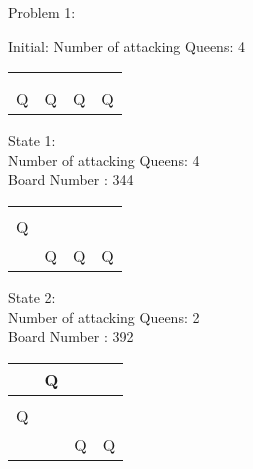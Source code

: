 \documentclass[a4paper,10pt]{article}
\begin{document}
Problem 1:\\
\hline
\begin{flushleft}
Initial: Number of attacking Queens: 4 \\
\vspace{5mm}
    \begin{tabular}{| l | l | l | l |}
    \hline
     & & & \\ \hline
     & & & \\ \hline
     & & & \\ \hline
    Q & Q & Q & Q \\ \hline
    \end{tabular}
\break
\break
\begin{flushleft}
State 1:\\
Number of attacking Queens: 4 \\
Board Number : 344 \\
\vspace{5mm}
    \begin{tabular}{| l | l | l | l |}
    \hline
     & & & \\ \hline
     & & & \\ \hline
     Q & & & \\ \hline
     & Q & Q & Q \\ \hline
    \end{tabular}
\break
\break
\begin{flushleft}
State 2:\\
Number of attacking Queens: 2\\
Board Number : 392\\
\vspace{5mm}
    \begin{tabular}{| l | l | l | l |}
    \hline
     & Q & & \\ \hline
     & & & \\ \hline
     Q & & & \\ \hline
     & & Q & Q \\ \hline
    \end{tabular}
\break
\break


\end{flushleft}
\end{flushleft}
\end{flushleft}
\end{document}

